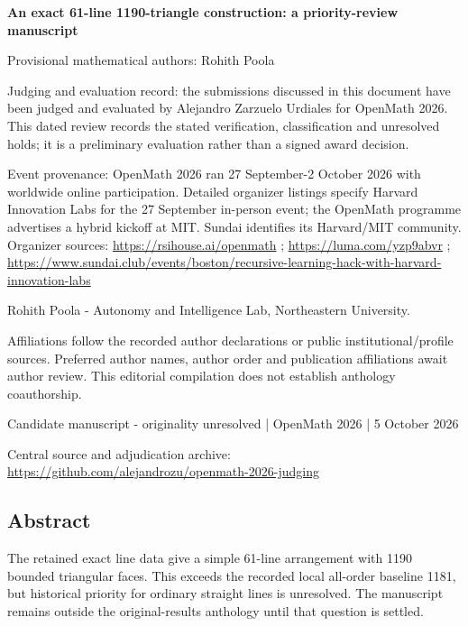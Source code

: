 \documentclass[11pt,a4paper]{article}
\begin{document}
{\LARGE\bfseries An exact 61-line 1190-triangle construction: a priority-review manuscript\par}\medskip
{\small Provisional mathematical authors: Rohith Poola\par}\medskip
{\small Judging and evaluation record: the submissions discussed in this document have been judged and evaluated by Alejandro Zarzuelo Urdiales for OpenMath 2026. This dated review records the stated verification, classification and unresolved holds; it is a preliminary evaluation rather than a signed award decision.\par}

{\small Event provenance: OpenMath 2026 ran 27 September-2 October 2026 with worldwide online participation. Detailed organizer listings specify Harvard Innovation Labs for the 27 September in-person event; the OpenMath programme advertises a hybrid kickoff at MIT. Sundai identifies its Harvard/MIT community. Organizer sources: \url{https://rsihouse.ai/openmath} ; \url{https://luma.com/yzp9abvr} ; \url{https://www.sundai.club/events/boston/recursive-learning-hack-with-harvard-innovation-labs}\par}

{\small Rohith Poola  -  Autonomy and Intelligence Lab, Northeastern University.\par}

{\small Affiliations follow the recorded author declarations or public institutional/profile sources. Preferred author names, author order and publication affiliations await author review. This editorial compilation does not establish anthology coauthorship.\par}

{\small Candidate manuscript  -  originality unresolved | OpenMath 2026 | 5 October 2026\par}\medskip
{\small Central source and adjudication archive: \url{https://github.com/alejandrozu/openmath-2026-judging}\par}

\subsection{Abstract}
The retained exact line data give a simple 61-line arrangement with 1190 bounded triangular faces. This exceeds the recorded local all-order baseline 1181, but historical priority for ordinary straight lines is unresolved. The manuscript remains outside the original-results anthology until that question is settled.
\end{document}
